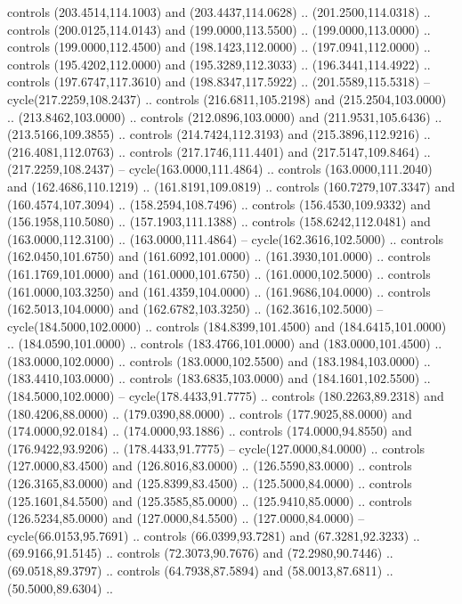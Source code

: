   controls (203.4514,114.1003) and (203.4437,114.0628) .. (201.2500,114.0318) ..
  controls (200.0125,114.0143) and (199.0000,113.5500) .. (199.0000,113.0000) ..
  controls (199.0000,112.4500) and (198.1423,112.0000) .. (197.0941,112.0000) ..
  controls (195.4202,112.0000) and (195.3289,112.3033) .. (196.3441,114.4922) ..
  controls (197.6747,117.3610) and (198.8347,117.5922) .. (201.5589,115.5318) --
  cycle(217.2259,108.2437) .. controls (216.6811,105.2198) and
  (215.2504,103.0000) .. (213.8462,103.0000) .. controls (212.0896,103.0000) and
  (211.9531,105.6436) .. (213.5166,109.3855) .. controls (214.7424,112.3193) and
  (215.3896,112.9216) .. (216.4081,112.0763) .. controls (217.1746,111.4401) and
  (217.5147,109.8464) .. (217.2259,108.2437) -- cycle(163.0000,111.4864) ..
  controls (163.0000,111.2040) and (162.4686,110.1219) .. (161.8191,109.0819) ..
  controls (160.7279,107.3347) and (160.4574,107.3094) .. (158.2594,108.7496) ..
  controls (156.4530,109.9332) and (156.1958,110.5080) .. (157.1903,111.1388) ..
  controls (158.6242,112.0481) and (163.0000,112.3100) .. (163.0000,111.4864) --
  cycle(162.3616,102.5000) .. controls (162.0450,101.6750) and
  (161.6092,101.0000) .. (161.3930,101.0000) .. controls (161.1769,101.0000) and
  (161.0000,101.6750) .. (161.0000,102.5000) .. controls (161.0000,103.3250) and
  (161.4359,104.0000) .. (161.9686,104.0000) .. controls (162.5013,104.0000) and
  (162.6782,103.3250) .. (162.3616,102.5000) -- cycle(184.5000,102.0000) ..
  controls (184.8399,101.4500) and (184.6415,101.0000) .. (184.0590,101.0000) ..
  controls (183.4766,101.0000) and (183.0000,101.4500) .. (183.0000,102.0000) ..
  controls (183.0000,102.5500) and (183.1984,103.0000) .. (183.4410,103.0000) ..
  controls (183.6835,103.0000) and (184.1601,102.5500) .. (184.5000,102.0000) --
  cycle(178.4433,91.7775) .. controls (180.2263,89.2318) and (180.4206,88.0000)
  .. (179.0390,88.0000) .. controls (177.9025,88.0000) and (174.0000,92.0184) ..
  (174.0000,93.1886) .. controls (174.0000,94.8550) and (176.9422,93.9206) ..
  (178.4433,91.7775) -- cycle(127.0000,84.0000) .. controls (127.0000,83.4500)
  and (126.8016,83.0000) .. (126.5590,83.0000) .. controls (126.3165,83.0000)
  and (125.8399,83.4500) .. (125.5000,84.0000) .. controls (125.1601,84.5500)
  and (125.3585,85.0000) .. (125.9410,85.0000) .. controls (126.5234,85.0000)
  and (127.0000,84.5500) .. (127.0000,84.0000) -- cycle(66.0153,95.7691) ..
  controls (66.0399,93.7281) and (67.3281,92.3233) .. (69.9166,91.5145) ..
  controls (72.3073,90.7676) and (72.2980,90.7446) .. (69.0518,89.3797) ..
  controls (64.7938,87.5894) and (58.0013,87.6811) .. (50.5000,89.6304) ..
